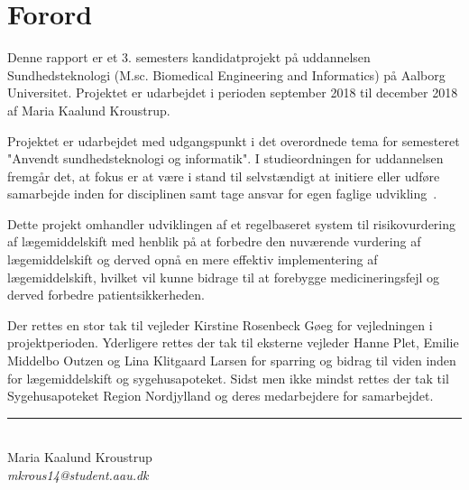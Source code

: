\chapter*{Forord}
Denne rapport er et 3. semesters kandidatprojekt på uddannelsen Sundhedsteknologi (M.sc. Biomedical Engineering and Informatics) på Aalborg Universitet. Projektet er udarbejdet i perioden september 2018 til december 2018 af Maria Kaalund Kroustrup. 

Projektet er udarbejdet med udgangspunkt i det overordnede tema for semesteret "Anvendt sundhedsteknologi og informatik". I studieordningen for uddannelsen fremgår det, at fokus er at være i stand til selvstændigt at initiere eller udføre samarbejde inden for disciplinen samt tage ansvar for egen faglige udvikling~\citep{Studieordning2011}. 

Dette projekt omhandler udviklingen af et regelbaseret system til risikovurdering af lægemiddelskift med henblik på at forbedre den nuværende vurdering af lægemiddelskift og derved opnå en mere effektiv implementering af lægemiddelskift, hvilket vil kunne bidrage til at forebygge medicineringsfejl og derved forbedre patientsikkerheden. 

Der rettes en stor tak til vejleder Kirstine Rosenbeck Gøeg for vejledningen i projektperioden. Yderligere rettes der tak til eksterne vejleder Hanne Plet, Emilie Middelbo Outzen og Lina Klitgaard Larsen for sparring og bidrag til viden inden for lægemiddelskift og sygehusapoteket. Sidst men ikke mindst rettes der tak til Sygehusapoteket Region Nordjylland og deres medarbejdere for samarbejdet. 

\vspace{1.5cm}
\begin{center}
\rule{6cm}{0.4pt} \\
Maria Kaalund Kroustrup \\
\textit{mkrous14@student.aau.dk}
\end{center}